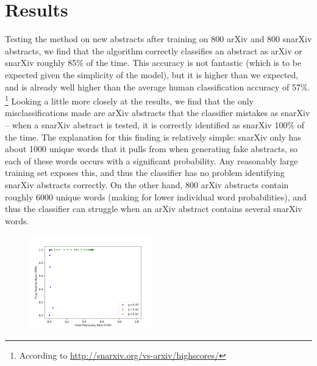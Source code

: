 \documentclass{article}
\begin{document}
\section{Results}
Testing the method on new abstracts after training on 800 arXiv and 800 snarXiv abstracts, we find that the algorithm correctly classifies an abstract as arXiv or snarXiv roughly 85\% of the time.
This accuracy is not fantastic (which is to be expected given the simplicity of the model), but it is higher than we expected, and is already well higher than the average human classification accuracy of 57\%.%
\footnote{According to \url{http://snarxiv.org/vs-arxiv/highscores/}}
Looking a little more closely at the results, we find that the only misclassifications made are arXiv abstracts that the classifier mistakes as snarXiv -- when a snarXiv abstract is tested, it is correctly identified as snarXiv 100\% of the time.
The explanation for this finding is relatively simple: snarXiv only has about 1000 unique words that it pulls from when generating fake abstracts, so each of these words occurs with a significant probability.
Any reasonably large training set exposes this, and thus the classifier has no problem identifying snarXiv abstracts correctly.
On the other hand, 800 arXiv abstracts contain roughly 6000 unique words (making for lower individual word probabilities), and thus the classifier can struggle when an arXiv abstract contains several snarXiv words.




\begin{figure}[!htbp]
\centering
	\includegraphics[width=0.48\textwidth]{../figures/FDR_TPR_plot.png}
\end{figure}
\end{document}
